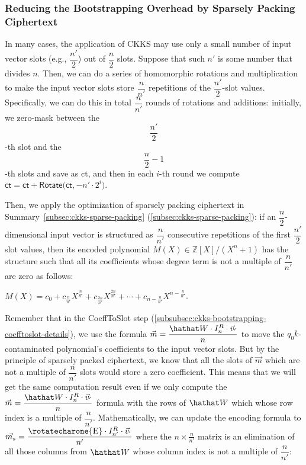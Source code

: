 \subsubsection{Reducing the Bootstrapping Overhead by Sparsely Packing Ciphertext}
\label{subsubsec:ckks-bootstrapping-time-reduction}

In many cases, the application of CKKS may use only a small number of input vector slots (e.g., $\dfrac{n'}{2}$) out of $\dfrac{n}{2}$ slots. Suppose that such $n'$ is some number that divides $n$. Then, we can do a series of homomorphic rotations and multiplication to make the input vector slots store $\dfrac{n}{n'}$ repetitions of the $\dfrac{n'}{2}$-slot values. Specifically, we can do this in total $\dfrac{n}{n'}$ rounds of rotations and additions: initially, we zero-mask between the $$\frac{n'}{2}$$-th slot and the $$\frac{n}{2} - 1$$-th slots and save as \textsf{ct}, and then in each $i$-th round we compute $\textsf{ct} = \textsf{ct} +  \textsf{Rotate}\bm(\textsf{ct}, -n' \cdot 2^i\bm)$. 

Then, we apply the optimization of sparsely packing ciphertext in Summary~\ref{subsec:ckks-sparse-packing} (\autoref{subsec:ckks-sparse-packing}): if an $\dfrac{n}{2}$-dimensional input vector is structured as $\dfrac{n}{n'}$ consecutive repetitions of the first $\dfrac{n'}{2}$ slot values, then its encoded polynomial $M(X) \in \mathbb{Z}[X] / (X^{n} + 1)$ has the structure such that all its coefficients whose degree term is not a multiple of $\dfrac{n}{n'}$ are zero as follows:

$M(X) = c_0 + c_{\frac{n}{n'}}X^{\frac{n}{n'}} + c_{\frac{2n}{n'}}X^{\frac{2n}{n'}} + \cdots + c_{n - \frac{n}{n'}}X^{n - \frac{n}{n'}}$. 

Remember that in the \textsf{CoeffToSlot} step (\autoref{subsubsec:ckks-bootstrapping-coefftoslot-details}), we use the formula $\vec{m} = \dfrac{\hathat W \cdot I_n^R \cdot \vec{v}_{'}}{n}$ to move the $q_0k$-contaminated polynomial's coefficients to the input vector slots. But by the principle of sparsely packed ciphertext, we know that all the slots of $\vec{m}$ which are not a multiple of $\dfrac{n}{n'}$ slots would store a zero coefficient. This means that we will get the same computation result even if we only compute the $\vec{m} = \dfrac{\hathat W \cdot I_n^R \cdot \vec{v}_{'}}{n}$ formula with the rows of $\hathat W$ which whose row index is a multiple of $\dfrac{n}{n'}$. Mathematically, we can update the encoding formula to $\vec{m_s} = \dfrac{ \text{\rotatecharone{E}} \cdot I_{n'}^R \cdot \vec{v}_{'}}{n'}$ where the $n \times \frac{n}{n'}$ matrix  is an elimination of all those columns from $\hathat W$ whose column index is not a multiple of $\dfrac{n}{n'}$:

